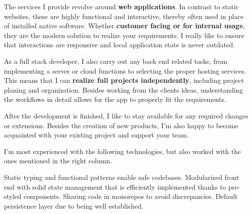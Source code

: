 \documentclass[12pt,a4paper,ragged2e,withhyper]{altacv} %
\begin{document}
\begin{paracol}{2}


The services I provide revolve around \textbf{web applications}.
In contrast to static websites, these are highly functional and interactive,
thereby often used in place of installed native software.
Whether \textbf{customer facing or for internal usage},
they are the modern solution to realize your requirements.
I really like to ensure that interactions are responsive
and local application state is never outdated.

\smallskip

As a full stack developer, I also carry out any back end related tasks,
from implementing a server or cloud functions to selecting the proper hosting services.
This means that I can \textbf{realize full projects independently},
including project planing and organization.
Besides working from the clients ideas,
understanding the workflows in detail allows for the app to properly fit the requirements.

\smallskip

After the development is finished, I like to stay available for any required changes or extensions.
Besides the creation of new products,
I'm also happy to become acquainted with your existing project and support your team.

\medskip


I'm most experienced with the following technologies,
but also worked with the ones mentioned in the right column.

\medskip

%
    {Static typing and functional patterns enable safe codebases.}
\smallskip
{}%
    {Modularized front end with solid state management
    that is efficiently implemented thanks to pre-styled components.}
\smallskip
{}%
    {Sharing code in monorepos to avoid discrepancies.}
\smallskip
{}%
    {Default persistence layer due to being well established.}

\medskip



\end{paracol}
\end{document}
